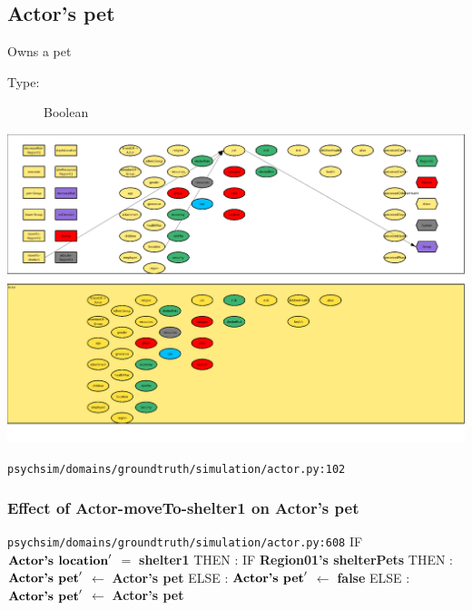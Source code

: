 \documentclass{article}%
\begin{document}
\subsection{Actor's pet}%
\label{subsec:Actor's pet}%
Owns a pet%
\begin{description}%
\item[Type:]%
Boolean%
\end{description}%
\includegraphics[width=\textwidth]{images/petOfActor.png}%
\begin{flushleft}%
\verb|psychsim/domains/groundtruth/simulation/actor.py:102|%
\end{flushleft}%
\subsubsection{Effect of Actor{-}moveTo{-}shelter1 on Actor's pet}%
\label{ssubsec:Effect of Actor{-}moveTo{-}shelter1 on Actor's pet}%
\begin{flushleft}%
\verb|psychsim/domains/groundtruth/simulation/actor.py:608|%
\linebreak%
IF %
$\mbox{\textbf{Actor's location}} '$%
$=$%
\textbf{shelter1}%
\linebreak%
\hspace*{2em}%
THEN %
: %
IF %
\textbf{Region01's shelterPets}%
\linebreak%
\hspace*{4em}%
THEN %
: %
$\mbox{\textbf{Actor's pet}} '$%
$\leftarrow$%
\textbf{Actor's pet}%
\linebreak%
\hspace*{4em}%
ELSE %
: %
$\mbox{\textbf{Actor's pet}} '$%
$\leftarrow$%
\textbf{false}%
\linebreak%
\hspace*{2em}%
ELSE %
: %
$\mbox{\textbf{Actor's pet}} '$%
$\leftarrow$%
\textbf{Actor's pet}%
\end{flushleft}
\end{document}
